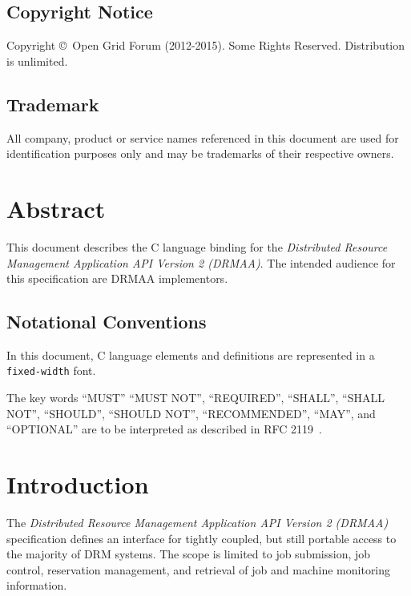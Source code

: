 \documentclass{article}
\newcommand{\copyrightyears}{2012-2015}
\newcommand{\h}[1]{\texttt{#1}}
\begin{document}
\subsection*{Copyright Notice}

Copyright \copyright \ Open Grid Forum (\copyrightyears).  Some Rights Reserved.
Distribution is unlimited.\\

\subsection*{Trademark}

All company, product or service names referenced in this document are used for identification purposes only and may be trademarks of their respective owners. \\

\section*{Abstract}

This document describes the C language binding for the \emph{Distributed Resource Management Application API Version 2 (DRMAA)}. The intended audience for this specification are DRMAA implementors. \\

\newpage

\subsection*{Notational Conventions}
\label{sec:rfc2119}

In this document, C language elements and definitions are represented in a \h{fixed-width} font. 

The key words \enquote{MUST} \enquote{MUST NOT}, \enquote{REQUIRED}, \enquote{SHALL}, \enquote{SHALL NOT}, \enquote{SHOULD}, \enquote{SHOULD NOT}, \enquote{RECOMMENDED}, \enquote{MAY},  and \enquote{OPTIONAL} are to be interpreted as described in RFC 2119~\cite{rfc2119}. 

\newpage
\tableofcontents
\newpage

\section{Introduction}
\label{sec:introduction}

 The \emph{Distributed Resource Management Application API Version 2 (DRMAA)} specification defines an interface for tightly coupled, but still portable access to the majority of DRM systems. The scope is limited to job submission, job control, reservation management, and retrieval of job and machine monitoring information. 
\end{document}
